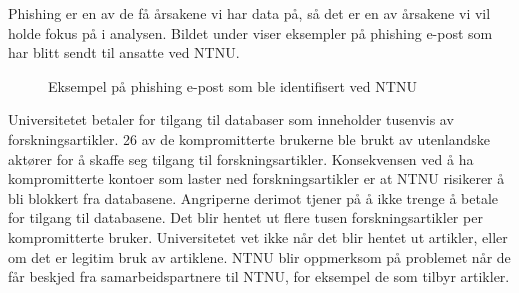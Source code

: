 Phishing er en av de få årsakene vi har data på, så det er en av årsakene vi vil holde fokus på i analysen. Bildet under viser eksempler på phishing e-post som har blitt sendt til ansatte ved NTNU.

\begin{figure}[H]%
    \centering
    \qquad
    \qquad
    \caption[Eksempel på phishing e-post]{Eksempel på phishing e-post som ble identifisert ved NTNU}%
    \label{fig:example}%
\end{figure}

Universitetet betaler for tilgang til databaser som inneholder tusenvis av forskningsartikler. 26 av de kompromitterte brukerne ble brukt av utenlandske aktører for å skaffe seg tilgang til forskningsartikler. Konsekvensen ved å ha kompromitterte kontoer som laster ned forskningsartikler er at NTNU risikerer å bli blokkert fra databasene. Angriperne derimot tjener på å ikke trenge å betale for tilgang til databasene. Det blir hentet ut flere tusen forskningsartikler per kompromitterte bruker. Universitetet vet ikke når det blir hentet ut artikler, eller om det er legitim bruk av artiklene. NTNU blir oppmerksom på problemet når de får beskjed fra samarbeidspartnere til NTNU, for eksempel de som tilbyr artikler. 

